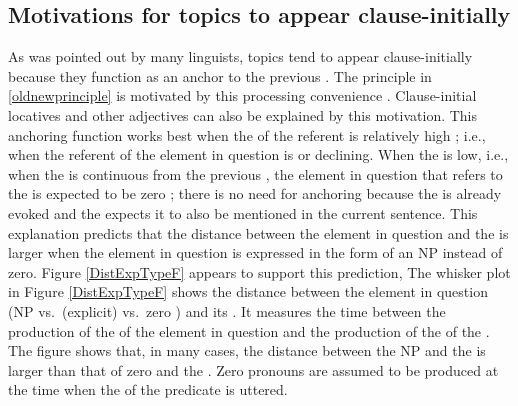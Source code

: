 \subsection{Motivations for topics to appear clause-initially}\label{TopicAppearClause-Initially}

As was pointed out by many linguists,
topics tend to appear clause-initially
because they function as an anchor to the previous .
The principle in \ref{oldnewprinciple} is motivated by this processing convenience \cite[e.g.,][]{keenan77}.
Clause-initial locatives and other adjectives can also be explained by this motivation.
This anchoring function works best when the  of the referent is relatively high \cite{givon83};
i.e.,
when the referent of the element in question is  or declining.
When the  is low, i.e., when the  is continuous from the previous ,
the element in question that refers to the  is expected to be zero \cite{givon83,gundeletal93,ariel90};
there is no need for anchoring because the  is already evoked and the  expects it to also be mentioned in the current sentence.
This explanation predicts that the distance between the element in question and the  is larger when the element in question is expressed in the form of an NP instead of zero.
Figure \ref{DistExpTypeF} appears to support this prediction,
The whisker plot in Figure \ref{DistExpTypeF} shows the distance between the element in question (NP vs.\ (explicit)  vs.\ zero ) and its .
It measures the time between the production of the   of the element in question and the production of the  of the .
The figure shows that, in many cases, the distance between the NP and the  is larger than that of zero and the .
Zero pronouns are assumed to be produced at the time
when the  of the predicate is uttered.

